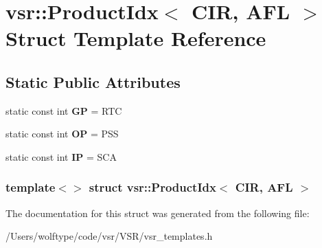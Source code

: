 \hypertarget{structvsr_1_1_product_idx_3_01_c_i_r_00_01_a_f_l_01_4}{\section{vsr\-:\-:Product\-Idx$<$ C\-I\-R, A\-F\-L $>$ Struct Template Reference}
\label{structvsr_1_1_product_idx_3_01_c_i_r_00_01_a_f_l_01_4}
}
\subsection*{Static Public Attributes}
\begin{DoxyCompactItemize}
\item 
\hypertarget{structvsr_1_1_product_idx_3_01_c_i_r_00_01_a_f_l_01_4_afa51049df089718ca7ab0e0feb99cb21}{static const int {\bfseries G\-P} = R\-T\-C}\label{structvsr_1_1_product_idx_3_01_c_i_r_00_01_a_f_l_01_4_afa51049df089718ca7ab0e0feb99cb21}

\item 
\hypertarget{structvsr_1_1_product_idx_3_01_c_i_r_00_01_a_f_l_01_4_aadfab29aeb43c710b3bc8a3074adf467}{static const int {\bfseries O\-P} = P\-S\-S}\label{structvsr_1_1_product_idx_3_01_c_i_r_00_01_a_f_l_01_4_aadfab29aeb43c710b3bc8a3074adf467}

\item 
\hypertarget{structvsr_1_1_product_idx_3_01_c_i_r_00_01_a_f_l_01_4_a1955feeb6478ee808cdf1bbf667e2444}{static const int {\bfseries I\-P} = S\-C\-A}\label{structvsr_1_1_product_idx_3_01_c_i_r_00_01_a_f_l_01_4_a1955feeb6478ee808cdf1bbf667e2444}

\end{DoxyCompactItemize}
\subsubsection*{template$<$$>$ struct vsr\-::\-Product\-Idx$<$ C\-I\-R, A\-F\-L $>$}



The documentation for this struct was generated from the following file\-:\begin{DoxyCompactItemize}
\item 
/\-Users/wolftype/code/vsr/\-V\-S\-R/vsr\-\_\-templates.\-h\end{DoxyCompactItemize}

